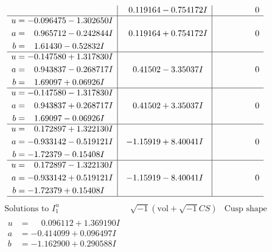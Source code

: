 \documentclass[1p]{elsarticle_modified}
\theoremstyle{definition}
\newcommand{\I}{\sqrt{-1}}
\begin{document}
$$\begin{array}{c|c|c}
 & \phantom{-}0.119164 - 0.754172 I & \phantom{-0.000000 } 0 \\ \hline\begin{aligned}
u &= -0.096475 - 1.302650 I \\
a &= \phantom{-}0.965712 - 0.242844 I \\
b &= \phantom{-}1.61430 - 0.52832 I\end{aligned}
 & \phantom{-}0.119164 + 0.754172 I & \phantom{-0.000000 } 0 \\ \hline\begin{aligned}
u &= -0.147580 + 1.317830 I \\
a &= \phantom{-}0.943837 - 0.268717 I \\
b &= \phantom{-}1.69097 + 0.06926 I\end{aligned}
 & \phantom{-}0.41502 - 3.35037 I & \phantom{-0.000000 } 0 \\ \hline\begin{aligned}
u &= -0.147580 - 1.317830 I \\
a &= \phantom{-}0.943837 + 0.268717 I \\
b &= \phantom{-}1.69097 - 0.06926 I\end{aligned}
 & \phantom{-}0.41502 + 3.35037 I & \phantom{-0.000000 } 0 \\ \hline\begin{aligned}
u &= \phantom{-}0.172897 + 1.322130 I \\
a &= -0.933142 - 0.519121 I \\
b &= -1.72379 - 0.15408 I\end{aligned}
 & -1.15919 + 8.40041 I & \phantom{-0.000000 } 0 \\ \hline\begin{aligned}
u &= \phantom{-}0.172897 - 1.322130 I \\
a &= -0.933142 + 0.519121 I \\
b &= -1.72379 + 0.15408 I\end{aligned}
 & -1.15919 - 8.40041 I & \phantom{-0.000000 } 0\\
 \hline 
 \end{array}$$\newpage$$\begin{array}{c|c|c}  
\text{Solutions to }I^u_{1}& \I (\text{vol} + \sqrt{-1}CS) & \text{Cusp shape}\\
 \hline 
\begin{aligned}
u &= \phantom{-}0.096112 + 1.369190 I \\
a &= -0.414099 + 0.096497 I \\
b &= -1.162900 + 0.290588 I\end{aligned}

\end{array}$$
\end{document}
